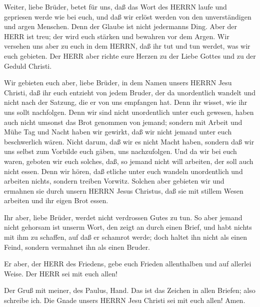  Weiter, liebe Brüder, betet für uns, daß das Wort des HERRN
laufe und gepriesen werde wie bei euch,  und daß wir erlöst
werden von den unverständigen und argen Menschen. Denn der Glaube ist
nicht jedermanns Ding.  Aber der HERR ist treu; der wird
euch stärken und bewahren vor dem Argen.  Wir versehen uns
aber zu euch in dem HERRN, daß ihr tut und tun werdet, was wir euch
gebieten.  Der HERR aber richte eure Herzen zu der Liebe
Gottes und zu der Geduld Christi.

 Wir gebieten euch aber, liebe Brüder, in dem Namen unsers
HERRN Jesu Christi, daß ihr euch entzieht von jedem Bruder, der da
unordentlich wandelt und nicht nach der Satzung, die er von uns
empfangen hat.  Denn ihr wisset, wie ihr uns sollt
nachfolgen. Denn wir sind nicht unordentlich unter euch gewesen,
 haben auch nicht umsonst das Brot genommen von jemand;
sondern mit Arbeit und Mühe Tag und Nacht haben wir gewirkt, daß wir
nicht jemand unter euch beschwerlich wären.  Nicht darum,
daß wir es nicht Macht haben, sondern daß wir uns selbst zum Vorbilde
euch gäben, uns nachzufolgen.  Und da wir bei euch waren,
geboten wir euch solches, daß, so jemand nicht will arbeiten, der soll
auch nicht essen.  Denn wir hören, daß etliche unter euch
wandeln unordentlich und arbeiten nichts, sondern treiben Vorwitz.
 Solchen aber gebieten wir und ermahnen sie durch unsern
HERRN Jesus Christus, daß sie mit stillem Wesen arbeiten und ihr eigen
Brot essen.

 Ihr aber, liebe Brüder, werdet nicht verdrossen Gutes zu
tun.  So aber jemand nicht gehorsam ist unserm Wort, den
zeigt an durch einen Brief, und habt nichts mit ihm zu schaffen, auf daß
er schamrot werde;  doch haltet ihn nicht als einen Feind,
sondern vermahnet ihn als einen Bruder.

 Er aber, der HERR des Friedens, gebe euch Frieden
allenthalben und auf allerlei Weise. Der HERR sei mit euch allen!

 Der Gruß mit meiner, des Paulus, Hand. Das ist das Zeichen
in allen Briefen; also schreibe ich.  Die Gnade unsers
HERRN Jesu Christi sei mit euch allen! Amen.
